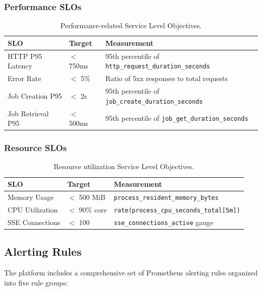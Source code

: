 \subsubsection{Performance SLOs}

\begin{table}[ht]
\centering
\caption{Performance-related Service Level Objectives.}
\label{tab:performance-slos}
\begin{tabular}{llp{6cm}}
\hline
\textbf{SLO} & \textbf{Target} & \textbf{Measurement} \\
\hline
HTTP P95 Latency & $<$ 750ms & 95th percentile of \texttt{http\_request\_duration\_seconds} \\
Error Rate & $<$ 5\% & Ratio of 5xx responses to total requests \\
Job Creation P95 & $<$ 2s & 95th percentile of \texttt{job\_create\_duration\_seconds} \\
Job Retrieval P95 & $<$ 500ms & 95th percentile of \texttt{job\_get\_duration\_seconds} \\
\hline
\end{tabular}
\end{table}

\subsubsection{Resource SLOs}

\begin{table}[ht]
\centering
\caption{Resource utilization Service Level Objectives.}
\label{tab:resource-slos}
\begin{tabular}{llp{6cm}}
\hline
\textbf{SLO} & \textbf{Target} & \textbf{Measurement} \\
\hline
Memory Usage & $<$ 500 MiB & \texttt{process\_resident\_memory\_bytes} \\
CPU Utilization & $<$ 90\% core & \texttt{rate(process\_cpu\_seconds\_total[5m])} \\
SSE Connections & $<$ 100 & \texttt{sse\_connections\_active} gauge \\
\hline
\end{tabular}
\end{table}

\subsection{Alerting Rules}

The platform includes a comprehensive set of Prometheus alerting rules organized into five rule groups:

